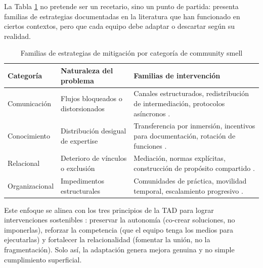 La Tabla \ref{tab:estrategias_mitigacion} no pretende ser un recetario, sino un punto de partida: presenta familias de estrategias documentadas en la literatura que han funcionado en ciertos contextos, pero que cada equipo debe adaptar o descartar según su realidad.

\begin{table}[htb]
    \caption{Familias de estrategias de mitigación por categoría de community smell}
    \label{tab:estrategias_mitigacion}
    \centering
    \small
    \begin{tabular}{@{}p{3.5cm}p{5cm}p{5cm}@{}}
        \toprule
        \textbf{Categoría}                 & \textbf{Naturaleza del problema} & \textbf{Familias de intervención}              \\
        \midrule
        Comunicación                       &
        Flujos bloqueados o distorsionados &
        Canales estructurados, redistribución de intermediación, protocolos asíncronos \cite{wilson_all_2006}.                 \\
        \addlinespace
        Conocimiento                       &
        Distribución desigual de expertise &
        Transferencia por inmersión, incentivos para documentación, rotación de funciones \cite{caballero2022communitysmells}. \\
        \addlinespace

        Relacional                         &
        Deterioro de vínculos o exclusión  &
        Mediación, normas explícitas, construcción de propósito compartido \cite{tulili2022burnout}.                           \\
        \addlinespace

        Organizacional                     &
        Impedimentos estructurales         &
        Comunidades de práctica, movilidad temporal, escalamiento progresivo \cite{saeeda2024nontechnicaldebt}.                \\
        \bottomrule
    \end{tabular}
\end{table}

Este enfoque se alinea con los tres principios de la TAD para lograr intervenciones sostenibles \cite{ryan_self-determination_2000}:
preservar la autonomía (co-crear soluciones, no imponerlas), reforzar la competencia (que el equipo tenga los medios para ejecutarlas) y fortalecer la relacionalidad (fomentar la unión, no la fragmentación).
Solo así, la adaptación genera mejora genuina y no simple cumplimiento superficial.

